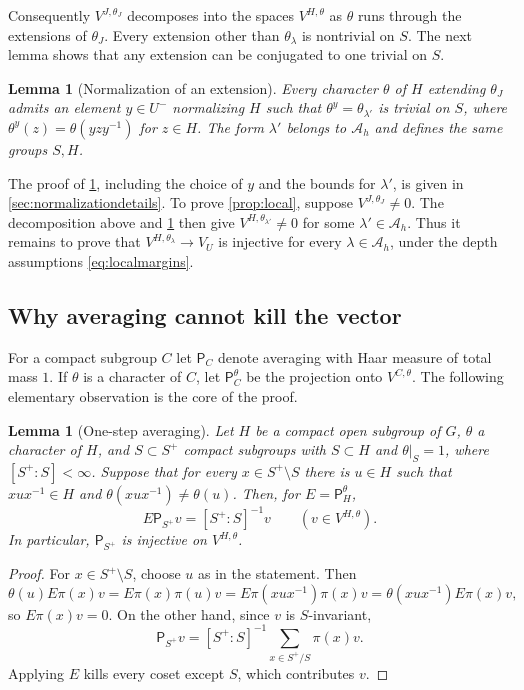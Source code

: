 \documentclass[11pt,reqno]{amsart}
\numberwithin{equation}{section}
\theoremstyle{plain}
\newtheorem{lemma}[theorem]{Lemma}
\theoremstyle{definition}
\theoremstyle{remark}
\theoremstyle{plain}
\newcommand{\lf}{\lambda}
\newcommand{\Avg}{\mathsf{P}}
\begin{document}
Consequently $V^{J,\theta_J}$ decomposes into the spaces
$V^{H,\theta}$ as $\theta$ runs through the extensions of $\theta_J$.
Every extension other than $\theta_\lf$ is nontrivial on $S$.
The next lemma shows that any extension can be conjugated to one
trivial on $S$.

\begin{lemma}[Normalization of an extension]\label{lem:normalize}
Every character $\theta$ of $H$ extending $\theta_J$ admits an
element $y\in U^-$ normalizing $H$ such that
$\theta^y=\theta_{\lf'}$ is trivial on $S$, where
$\theta^y(z)=\theta(yzy^{-1})$ for $z\in H$.
The form $\lf'$ belongs to $\mathcal A_h$ and defines the same groups $S,H$.
\end{lemma}

The proof of \cref{lem:normalize}, including the choice of $y$ and
the bounds for $\lf'$, is given in \cref{sec:normalizationdetails}.
To prove \cref{prop:local}, suppose $V^{J,\theta_J}\ne0$. The
decomposition above and \cref{lem:normalize} then give
$V^{H,\theta_{\lf'}}\ne0$ for some $\lf'\in\mathcal A_h$.
Thus it remains to prove that $V^{H,\theta_\lf}\to V_U$ is injective
for every $\lf\in\mathcal A_h$, under the depth assumptions
\eqref{eq:localmargins}.

\subsection{Why averaging cannot kill the vector}\label{sec:jacquet}
For a compact subgroup $C$ let $\Avg_C$ denote averaging with Haar
measure of total mass $1$. If $\theta$ is a character of $C$, let
$\Avg_C^\theta$ be the projection onto $V^{C,\theta}$.
The following elementary observation is the core of the proof. 

\begin{lemma}[One-step averaging]\label{lem:criterion}
Let $H$ be a compact open subgroup of $G$, $\theta$ a character of
$H$, and $S\subset S^+$ compact subgroups with $S\subset H$ and
$\theta|_S=1$, where $[S^+:S]<\infty$. Suppose that for every
$x\in S^+\setminus S$ there is $u\in H$ such that
$xux^{-1}\in H$ and $\theta(xux^{-1})\ne\theta(u)$.
Then, for $E=\Avg_H^\theta$,
\begin{equation}\label{eq:leftinverse}
E\Avg_{S^+}v=[S^+:S]^{-1}v\qquad(v\in V^{H,\theta}).
\end{equation}
In particular, $\Avg_{S^+}$ is injective on $V^{H,\theta}$.
\end{lemma}

\begin{proof}
For $x\in S^+\setminus S$, choose $u$ as in the statement. Then
\[
\theta(u)E\pi(x)v=E\pi(x)\pi(u)v=E\pi(xux^{-1})\pi(x)v=\theta(xux^{-1})E\pi(x)v,
\]
so $E\pi(x)v=0$. On the other hand, since $v$ is $S$-invariant,
\[
\Avg_{S^+}v=[S^+:S]^{-1}\sum_{x\in S^+/S}\pi(x)v.
\]
Applying $E$ kills every coset except $S$, which contributes $v$.
\end{proof}
\end{document}
